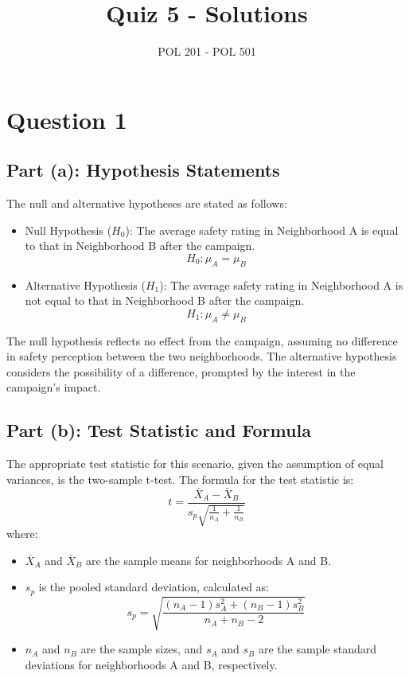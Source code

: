\documentclass{article}
\title{Quiz 5 - Solutions}
\author{POL 201 - POL 501}
\date{}
\begin{document}
\maketitle

\section*{Question 1}

\subsection*{Part (a): Hypothesis Statements}
The null and alternative hypotheses are stated as follows:
\begin{itemize}
    \item Null Hypothesis (\(H_0\)): The average safety rating in Neighborhood A is equal to that in Neighborhood B after the campaign.
    \[ H_0: \mu_A = \mu_B \]
    \item Alternative Hypothesis (\(H_1\)): The average safety rating in Neighborhood A is not equal to that in Neighborhood B after the campaign.
    \[ H_1: \mu_A \neq \mu_B \]
\end{itemize}
The null hypothesis reflects no effect from the campaign, assuming no difference in safety perception between the two neighborhoods. The alternative hypothesis considers the possibility of a difference, prompted by the interest in the campaign's impact.

\subsection*{Part (b): Test Statistic and Formula}
The appropriate test statistic for this scenario, given the assumption of equal variances, is the two-sample t-test. The formula for the test statistic is:
\[ t = \frac{\bar{X}_A - \bar{X}_B}{s_p \sqrt{\frac{1}{n_A} + \frac{1}{n_B}}} \]
where:
\begin{itemize}
    \item \(\bar{X}_A\) and \(\bar{X}_B\) are the sample means for neighborhoods A and B.
    \item \(s_p\) is the pooled standard deviation, calculated as:
    \[ s_p = \sqrt{\frac{(n_A-1)s_A^2 + (n_B-1)s_B^2}{n_A + n_B - 2}} \]
    \item \(n_A\) and \(n_B\) are the sample sizes, and \(s_A\) and \(s_B\) are the sample standard deviations for neighborhoods A and B, respectively.
\end{itemize}
\end{document}
